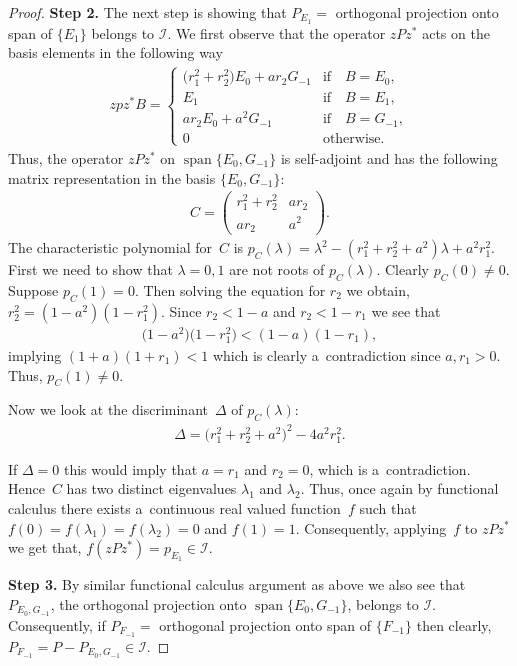 \begin{proof}
{\bf Step 2.} The next step is showing that $P_{E_1}=$ orthogonal projection onto span of $\{E_1\}$ belongs to $\mathcal I$.
We f\/irst observe that the operator $zPz^*$ acts on the basis elements in the following way
\begin{gather*}
zpz^* B=
\begin{cases}
\big(r_1^2+r_2^2\big)E_0+ar_2G_{-1} & \text{if}\quad  B=E_0,
\\
E_1 & \text{if}\quad  B=E_1,
\\
ar_2E_0+a^2 G_{-1} & \text{if}\quad  B=G_{-1},
\\
0 & \text{otherwise}.
\end{cases}
\end{gather*}
Thus, the operator $zPz^*$ on $\operatorname{span}\{E_0, G_{-1}\}$ is self-adjoint and has the following matrix representation in the
basis $\{E_0, G_{-1}\}$:
\begin{gather*}
C=\left(
\begin{matrix}
r_1^2+r_2^2 & ar_2
\\
ar_2 & a^2
\end{matrix}
\right).
\end{gather*}
The characteristic polynomial for~$C$ is $p_C(\lambda)=\lambda^2-(r_1^2+r_2^2+a^2)\lambda+a^2r_1^2$.
First we need to show that $\lambda=0,1$ are not roots of $p_C(\lambda)$.
Clearly $p_C(0) \neq 0$.
Suppose $p_C(1)=0$.
Then solving the equation for $r_2$ we obtain, $r_2^2=(1-a^2)(1-r_1^2)$.
Since $r_2 < 1-a$ and $r_2 < 1-r_1$ we see that
\begin{gather*}
\big(1-a^2\big)\big(1-r_1^2\big) < (1-a)(1-r_1),
\end{gather*}
implying $(1+a)(1+r_1)<1$ which is clearly a~contradiction since $a, r_1 >0$.
Thus, $p_C(1)\neq 0$.

Now we look at the discriminant~$\Delta$ of $p_C(\lambda)$:
\begin{gather*}
\Delta=\big(r_1^2+r_2^2+a^2\big)^2-4a^2r_1^2.
\end{gather*}

If $\Delta=0$ this would imply that $a=r_1$ and $r_2=0$, which is a~contradiction.
Hence~$C$ has two distinct eigenvalues $\lambda_1$ and $\lambda_2$.
Thus, once again by functional calculus there exists a~continuous real valued function~$f$ such that $f(0)=
f(\lambda_1)=f(\lambda_2)=0$ and $f(1)=1$.
Consequently, applying~$f$ to $zPz^*$ we get that, $f(zPz^*)= p_{E_1} \in \mathcal I$.

{\bf Step 3.} By similar functional calculus argument as above we also see that $P_{E_0, G_{-1}}$, the orthogonal
projection onto $\operatorname{span}\{E_0, G_{-1}\}$, belongs to $\mathcal I$.
Consequently, if $P_{F_{-1}}=$ orthogonal projection onto span of $\{F_{-1}\}$ then clearly, $P_{F_{-1}}= P- P_{E_0,
G_{-1}} \in \mathcal I$.


\end{proof}
